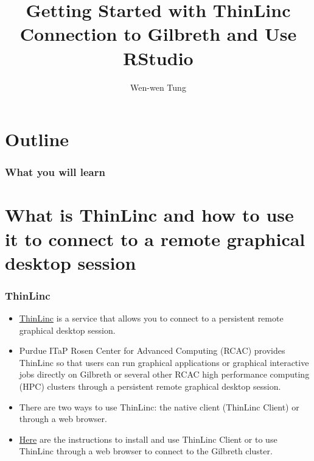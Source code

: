 \documentclass[aspectratio=169]{beamer}
\title[]{Getting Started with ThinLinc Connection to Gilbreth and Use RStudio} %
\author{Wen-wen Tung} %
\institute[Purdue University] %
{
EAPS, Purdue University \\
\medskip
\textit{wwtung@purdue.edu } %
}
\begin{document}
\begin{frame}
\titlepage %
\end{frame}

 \section*{Outline}
 \begin{frame}
    \frametitle{What you will learn}

    \tableofcontents
 \end{frame}
 

\section{What is ThinLinc and how to use it to connect to a remote graphical desktop session}
\begin{frame}
\frametitle{ThinLinc}

\begin{itemize}
\item \href{https://www.cendio.com/thinlinc/what-is-thinlinc}{ThinLinc} is a service that allows you to connect to a persistent remote graphical desktop session. 

\item Purdue ITaP Rosen Center for Advanced Computing (RCAC) provides ThinLinc so that users can run graphical applications or graphical interactive jobs directly on Gilbreth or several other RCAC high performance computing (HPC) clusters through a persistent remote graphical desktop session.

\item There are two ways to use ThinLinc: the native client (ThinLinc Client) or through a web browser.

\item \href{https://www.rcac.purdue.edu/knowledge/gilbreth/accounts/login/thinlinc}{Here} are the instructions to install and use ThinLinc Client or to use ThinLinc through a web browser to connect to the Gilbreth cluster.

\end{itemize}

\end{frame}
\end{document}
